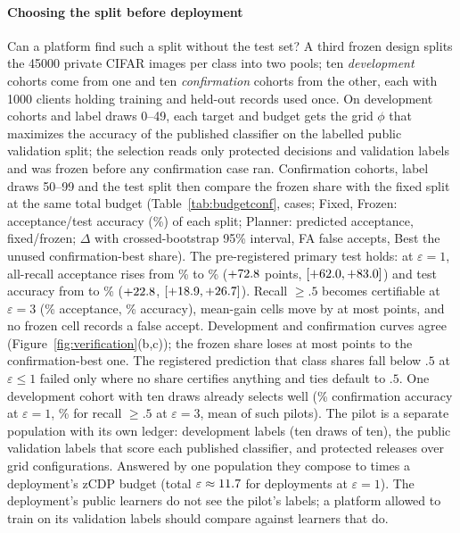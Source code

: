 \paragraph{Choosing the split before deployment}
Can a platform find such a split without the test set? A third frozen
design splits the 45000 private CIFAR images per class into two pools; ten
\emph{development} cohorts come from one and ten \emph{confirmation}
cohorts from the other, each with 1000 clients holding \BCRecTrain{}
training and \BCRecHeld{} held-out records used once. On development cohorts
and label draws 0--49, each target and budget gets the grid $\phi$ that
maximizes the accuracy of the published classifier on the labelled public
validation split; the selection reads only protected decisions and
validation labels and was frozen before any confirmation case ran. Confirmation cohorts, label
draws 50--99 and the test split then compare the frozen share with the fixed
split at the same total budget (Table~\ref{tab:budgetconf},
\BCCases{} cases; Fixed, Frozen: acceptance/test accuracy (\%) of each split;
Planner: predicted acceptance, fixed/frozen; $\Delta$ with crossed-bootstrap 95\% interval, FA false
accepts, Best the unused confirmation-best share). The pre-registered primary test holds: at
$\varepsilon=1$, all-recall acceptance rises from \BCFixedRecallOne{}\% to
\BCFrozenRecallOne{}\% ($+72.8$ points, $[+62.0, +83.0]$)
and test accuracy from \BCFixedRecallOneUtil{} to \BCFrozenRecallOneUtil{}\%
($+22.8$, $[+18.9, +26.7]$). Recall $\ge.5$ becomes
certifiable at $\varepsilon=3$ (\BCFrozenHalfThree{}\% acceptance,
\BCFrozenHalfThreeUtil{}\% accuracy), mean-gain cells move by at most
\BCGainMaxDiff{} points, and no frozen cell records a false accept.
Development and confirmation curves agree
(Figure~\ref{fig:verification}(b,c)); the frozen share loses at most
\BCMaxRegret{} points to the confirmation-best one. The registered prediction
that class shares fall below $.5$ at $\varepsilon\le1$ failed only where no
share certifies anything and ties default to $.5$. One development cohort
with ten draws already selects well (\BCPilotRecallOne{}\% confirmation
accuracy at $\varepsilon=1$, \BCPilotHalfThree{}\% for recall $\ge.5$ at
$\varepsilon=3$, mean of \BCPilotSubsamples{} such pilots). The pilot is a
separate population with its own ledger: \PilotDevLabels{} development labels
(ten draws of ten), the \PilotValLabels{} public validation labels that score
each published classifier, and \PilotReleases{} protected releases over
\PilotConfigs{} grid configurations. Answered by one population they compose
to \PilotRhoMult{} times a deployment's zCDP budget (total
$\varepsilon\approx11.7{}$ for deployments at $\varepsilon=1$). The
deployment's public learners do not see the pilot's labels; a platform allowed
to train on its validation labels should compare against learners that do.

